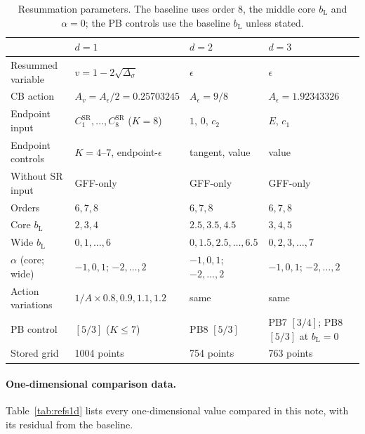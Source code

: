 \documentclass[11pt,a4paper]{article}
\numberwithin{equation}{section}
\newcommand{\Ds}{\Delta_\sigma}
\newcommand{\Ae}{A_\epsilon}
\newcommand{\bL}{b_{\mathrm L}}
\newcommand{\CSR}{C^{\mathrm{SR}}}
\begin{document}
\begin{table}[htbp]\centering\small\setlength{\tabcolsep}{3.5pt}
\begin{tabular}{@{}l l l l@{}}
\toprule
 & $d=1$ & $d=2$ & $d=3$\\ \midrule
Resummed variable & $v=1-2\sqrt{\Ds}$ & $\epsilon$ & $\epsilon$\\
CB action & $A_v=\Ae/2=0.25703245$ & $\Ae=9/8$ & $\Ae=1.92343326$\\
Endpoint input & $\CSR_1,\dots,\CSR_8$ ($K=8$) & $1$, $0$, $c_2$ & $E$, $c_1$\\
Endpoint controls & $K=4$--$7$, endpoint-$\epsilon$ & tangent, value & value\\
Without SR input & GFF-only & GFF-only & GFF-only\\
Orders & $6,7,8$ & $6,7,8$ & $6,7,8$\\
Core $\bL$ & $2,3,4$ & $2.5,3.5,4.5$ & $3,4,5$\\
Wide $\bL$ & $0,1,\dots,6$ & $0,1.5,2.5,\dots,6.5$ & $0,2,3,\dots,7$\\
$\alpha$ (core; wide) & $-1,0,1$; $-2,\dots,2$ & $-1,0,1$; $-2,\dots,2$ & $-1,0,1$; $-2,\dots,2$\\
Action variations & $1/A\times0.8,0.9,1.1,1.2$ & same & same\\
PB control & $[5/3]$ ($K\le7$) & PB8 $[5/3]$ & PB7 $[3/4]$; PB8 $[5/3]$ at $\bL=0$\\
Stored grid & 1004 points & 754 points & 763 points\\
\bottomrule
\end{tabular}
\caption{Resummation parameters. The baseline uses order 8, the middle core $\bL$ and
$\alpha=0$; the PB controls use the baseline $\bL$ unless stated.}
\label{tab:params}
\end{table}

\paragraph{One-dimensional comparison data.} Table~\ref{tab:refs1d} lists every
one-dimensional value compared in this note, with its residual from the baseline.
\end{document}
